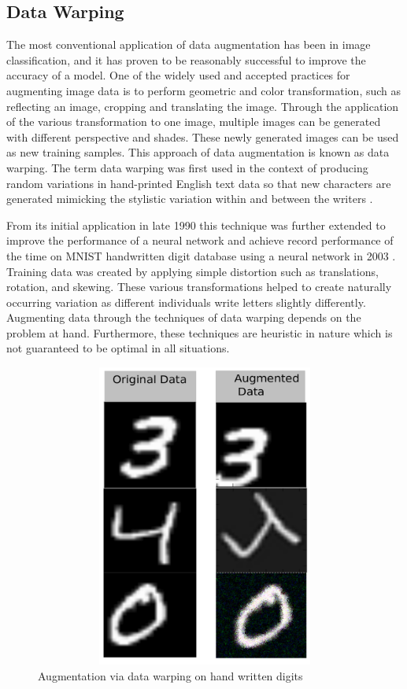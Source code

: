 \subsection{Data Warping} 
The most conventional application of data augmentation has been in image classification, and it has proven to be reasonably successful to improve the accuracy of a model. One of the widely used and accepted practices for augmenting image data is to perform geometric and color transformation, such as reflecting an image, cropping and translating the image. Through the application of the various transformation to one image, multiple images can be generated with different perspective and shades. These newly generated images can be used as new training samples. This approach of data augmentation is known as data warping. The term data warping was first used in the context of producing random variations in hand-printed English text data so that new characters are generated mimicking the stylistic variation within and between the writers \citep{yaeger1997effective}.

From its initial application in late 1990 this technique was further extended to improve the performance of a neural network and achieve record performance of the time on MNIST handwritten digit database using a neural network in 2003 \citep{wong2016understanding}. Training data was created by applying simple distortion such as translations, rotation, and skewing. These various transformations helped to create naturally occurring variation as different individuals write letters slightly differently. Augmenting data through the techniques of data warping depends on the problem at hand. Furthermore, these techniques are heuristic in nature which is not guaranteed to be optimal in all situations.

\begin{figure}[ht]
	\begin{center}
		\includegraphics[width=12cm,height=10cm,keepaspectratio]{images/simple_augment_mnist.png}
		\caption{Augmentation via data warping on hand written digits}
		\label{fig:data warping}
	\end{center}
\end{figure} 

